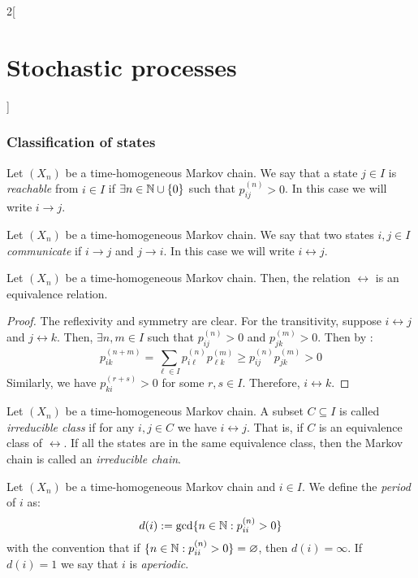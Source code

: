 \documentclass[../../../main_math.tex]{subfiles}
\begin{document}
\begin{multicols}{2}[\section{Stochastic processes}]
  \subsubsection{Classification of states}
  \begin{definition}
    Let $(X_n)$ be a time-homogeneous Markov chain. We say that a state $j\in I$ is \emph{reachable} from $i\in I$ if $\exists n\in \mathbb{N}\cup\{0\}$ such that $p_{ij}^{(n)}>0$. In this case we will write $i\to j$.
  \end{definition}
  \begin{definition}
    Let $(X_n)$ be a time-homogeneous Markov chain. We say that two states $i,j\in I$ \emph{communicate} if $i\to j$ and $j\to i$. In this case we will write $i\leftrightarrow j$.
  \end{definition}
  \begin{lemma}
    Let $(X_n)$ be a time-homogeneous Markov chain. Then, the relation $\leftrightarrow$ is an equivalence relation.
  \end{lemma}
  \begin{proof}
    The reflexivity and symmetry are clear. For the transitivity, suppose $i\leftrightarrow j$ and $j\leftrightarrow k$. Then, $\exists n,m\in I$ such that $p_{ij}^{(n)}>0$ and $p_{jk}^{(m)}>0$. Then by :
    \begin{equation}\label{SP:corolariChapKolmo}
      p_{ik}^{(n+m)}=\sum_{\ell\in I} p_{i\ell}^{(n)}p_{\ell k}^{(m)}\geq p_{ij}^{(n)}p_{jk}^{(m)}>0
    \end{equation}
    Similarly, we have $p_{ki}^{(r+s)}>0$ for some $r,s\in I$. Therefore, $i\leftrightarrow k$.
  \end{proof}
  \begin{definition}
    Let $(X_n)$ be a time-homogeneous Markov chain. A subset $C\subseteq I$ is called \emph{irreducible class} if for any $i,j\in C$ we have $i\leftrightarrow j$. That is, if $C$ is an equivalence class of $\leftrightarrow$. If all the states are in the same equivalence class, then the Markov chain is called an \emph{irreducible chain}.
  \end{definition}
  \begin{definition}
    Let $(X_n)$ be a time-homogeneous Markov chain and $i\in I$. We define the \emph{period} of $i$ as:
    $$d(i):=\gcd\{n\in\mathbb{N}:p_{ii}^{(n)}>0\}$$
    with the convention that if $\{n\in\mathbb{N}:p_{ii}^{(n)}>0\}=\varnothing$, then $d(i)=\infty$. If $d(i)=1$ we say that $i$ is \emph{aperiodic}.
  \end{definition}

\end{multicols}
\end{document}
